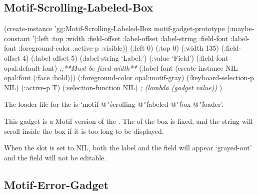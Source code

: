 \begin{group}
\section{Motif-Scrolling-Labeled-Box}
\label{motif-scrolling-labeled-box}

\begin{programexample}
(create-instance 'gg:Motif-Scrolling-Labeled-Box motif-gadget-prototype
   (:maybe-constant '(:left :top :width :field-offset :label-offset :label-string
                      :field-font :label-font :foreground-color :active-p :visible))
   (:left 0)
   (:top 0)
   (:width 135)
   (:field-offset 4)
   (:label-offset 5)
   (:label-string `Label:')
   (:value `Field')
   (:field-font opal:default-font)    {\it ;;**Must be fixed width**}
   (:label-font (create-instance NIL opal:font (:face :bold)))
   (:foreground-color opal:motif-gray)
   (:keyboard-selection-p NIL)
   (:active-p T)
   (:selection-function NIL)   {\it ; (lambda (gadget value))}
   )
\end{programexample}
\end{group}

\begin{center}
\end{center}

The loader file for the  is
`motif-@{\tt\char`\|}scrolling-@{\tt\char`\|}labeled-@{\tt\char`\|}box-@{\tt\char`\|}loader'.

This gadget is a Motif version of the .
The  of the box is fixed, and the
 string will scroll inside the box if it is too long to be
displayed.

When the  slot is set to NIL, both the label and the field will
appear `grayed-out' and the field will not be editable.



\begin{group}
\section{Motif-Error-Gadget}
\label{motif-error-gadget}
\begin{center}
\end{center}
\end{group}

